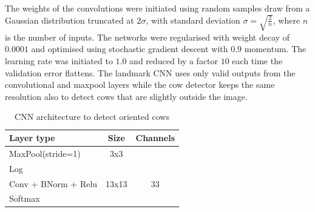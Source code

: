 \documentclass{cta-author}
\begin{document}
The weights of the convolutions were initiated using random samples draw from a Gaussian
distribution truncated at $2\sigma$, with standard deviation $\sigma=\sqrt{\frac{2}{n}}$,
where $n$ is the number of inputs\cite{DBLP:journals/corr/HeZR015}. The networks were regularised with weight decay of
$0.0001$ and optimised using stochastic gradient descent with $0.9$ momentum. The
learning rate was initiated to $1.0$ and reduced by a factor $10$ each time the validation
error flattens. The landmark CNN uses only valid outputs from the convolutional and maxpool
layers while the cow detector keeps the same resolution also to detect cows that are
slightly outside the image.

\begin{table}
\begin{center}
\begin{tabular}{|l|c|c|}
\hline
\textbf{Layer type} & \textbf{Size} & \textbf{Channels} \\
\hline

MaxPool(stride=1) & 3x3 &  \\
Log & & \\
Conv + BNorm + Relu & 13x13 & 33 \\
Softmax & & \\
\hline
\end{tabular}
\end{center}
\caption{CNN architecture to detect oriented cows
}
\label{tab:cowdirnet}
\end{table}
\end{document}
